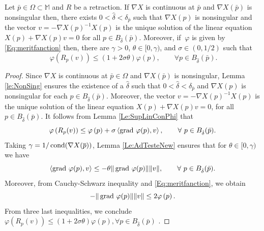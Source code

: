 \begin{lemma}\label{lemma:theta}
Let $\bar p\in \Omega\subset\mathbb{M}$ and  $R$ be a retraction. If $\nabla X$ is continuous at $\bar{p}$ and $\nabla X(\bar p)$ is nonsingular then, there exists $0<\hat{\delta}<\delta_{\bar{p}}$ such that $\nabla X(p)$ is nonsingular and the vector $v=-\nabla X(p)^{-1}X(p)$ is the  unique solution of the linear equation  $X(p)+\nabla X(p)v=0$ for all  $p\in B_{\hat{\delta}}(\bar{p})$. Moreover, if $~\varphi$ is given by \eqref{Eq:meritfanction} then, there are $\gamma>0$, $\theta\in[0,\gamma)$, and $\sigma\in(0,1/2)$  such that
\begin{equation}\label{eq:AdTesteNew} \nonumber
 ~\varphi\left(R_{p}(v)\right)\leq (1+2\sigma\theta)\varphi\left(p\right),\qquad\forall p\in B_{\hat{\delta}}(\bar{p}).
\end{equation}
\end{lemma}
\begin{proof}
Since $\nabla X$ is continuous at $\bar p\in \Omega$ and $\nabla X(\bar p)$ is nonsingular, Lemma \ref{le:NonSing} ensures the existence of a $\hat{\delta}$ such that $0<\hat{\delta}<\delta_{\bar{p}}$ and $\nabla X(p)$ is nonsingular  for  each $p\in B_{\hat{\delta}}(\bar{p})$.  Moreover, the vector $v=-\nabla X(p)^{-1}X(p)$ is the  unique solution of the linear equation  $X(p)+\nabla X(p)v=0$, for all  $p\in B_{\hat{\delta}}(\bar{p})$. It follows from Lemma \ref{Le:SupLinConPhi} that
\begin{equation}\nonumber
\varphi\left(R_{p}(v)\right) \leq \varphi\left(p\right)+ \sigma \left\langle\operatorname{grad}\,\varphi(p), v\right\rangle, \qquad  \forall~p\in B_{\hat{\delta}}(\bar{p}).
\end{equation}
 Taking $\gamma = 1/\operatorname{cond} (\nabla X(\overline{p}))$, Lemma \ref{Le:AdTesteNew} ensures that for $\theta\in [0,\gamma)$ we have
\begin{equation}\nonumber
\langle \operatorname{grad}\,\varphi(p), v \rangle \leq -{\theta}\|\operatorname{grad}\, \varphi(p)\| \| v\|, \qquad \forall ~p\in B_{\hat{\delta}}(\bar{p}).
\end{equation}
Moreover, from Cauchy-Schwarz inequality and \eqref{Eq:meritfanction},  we obtain
\begin{equation} \nonumber
-\|\operatorname{grad}\, \varphi(p)\| \| v\|\leq 2\varphi\left(p\right).
\end{equation}
From three last inequalities, we conclude  $\varphi\left(R_{p}(v)\right)\leq (1+2\sigma\theta)\varphi\left(p\right), \forall p\in B_{\hat{\delta}}(\bar{p})$ .
\end{proof}

